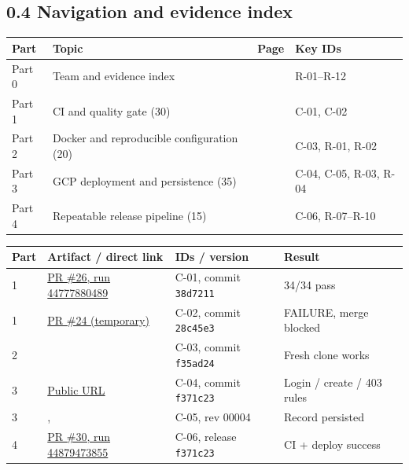 \documentclass[11pt,a4paper]{article}
\begin{document}
\subsection*{0.4 Navigation and evidence index}
\begin{longtable}{@{}L{1.6cm}L{7.6cm}L{1.4cm}L{5.6cm}@{}}
\toprule
\textbf{Part} & \textbf{Topic} & \textbf{Page} & \textbf{Key IDs} \\
\midrule
Part 0 & Team and evidence index & \pageref{part:0} & R-01--R-12 \\
Part 1 & CI and quality gate (30) & \pageref{part:1} & C-01, C-02 \\
Part 2 & Docker and reproducible configuration (20) & \pageref{part:2} & C-03, R-01, R-02 \\
Part 3 & GCP deployment and persistence (35) & \pageref{part:3} & C-04, C-05, R-03, R-04 \\
Part 4 & Repeatable release pipeline (15) & \pageref{part:4} & C-06, R-07--R-10 \\
\bottomrule
\end{longtable}

\begingroup\small
\begin{longtable}{@{}L{1.2cm}L{7.0cm}L{3.0cm}L{5.0cm}@{}}
\toprule
\textbf{Part} & \textbf{Artifact / direct link} & \textbf{IDs / version} & \textbf{Result} \\
 & \href{https://github.com/ssiriwan/cpe334-approval-system/actions/runs/44777880489}{PR \#26, run 44777880489} & C-01, commit \texttt{38d7211} & 34/34 pass \\
1 & \href{https://github.com/ssiriwan/cpe334-approval-system/pull/24}{PR \#24 (temporary)} & C-02, commit \texttt{28c45e3} & FAILURE, merge blocked \\
2 &  & C-03, commit \texttt{f35ad24} & Fresh clone works \\
3 & \href{https://sd3cdaba1-4d7hbszvwq-as.a.run.app}{Public URL} & C-04, commit \texttt{f371c23} & Login / create / 403 rules \\
3 & ,  & C-05, rev 00004 & Record persisted \\
4 & \href{https://github.com/ssiriwan/cpe334-approval-system/actions/runs/44879473855}{PR \#30, run 44879473855} & C-06, release \texttt{f371c23} & CI + deploy success \\
\bottomrule
\end{longtable}
\endgroup
\end{document}
